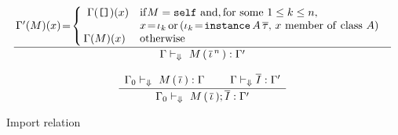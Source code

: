 \begin{figure}
\[ \begin{array}{cc}
	\displaystyle\frac
	 {\begin{array}{ll}
            \!\!\Gamma'(M)(x)\! = \!\left\{ \begin{array}{ll}
              \Gamma(\mbox{\tt{[]}})(x) & \mathrm{ if } M = \self\ \mathrm{ and, for\ some\ } 1 \leq k \leq n,\\
              & x\! = \! \iota_k
                    \,\mathrm{or}\, (\iota_k\! =\! \instance\ \!A\, \overline{\tau},\, x \mathrm{\ member\ of\ class\ } A)\\
               \!\!\Gamma(M)(x)          & \mathrm{ otherwise}
             \end{array}\right.
          \end{array}}
	 {\Gamma \vdash_{\Downarrow} \ M\, (\,\overline{\iitem}^{\,n}\,) : \Gamma'}  \\ \\
	\displaystyle\frac
	 {\begin{array}{ll}
	   \Gamma_0 \vdash_{\Downarrow} \ M\, (\,\overline{\iitem}\,) : \Gamma \:\:\: & \:\:\: 
           \Gamma \vdash_{\Downarrow} \overline{\importC} : \Gamma'
          \end{array}}
	 {\Gamma_0 \vdash_{\Downarrow} \ M\, (\,\overline{\iitem}\,); \overline{\importC} : \Gamma'} 
\end{array} \]
\caption{Import relation}
\label{fig:import-relation}
\end{figure} 

